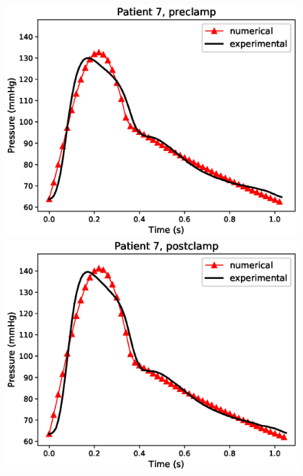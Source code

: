 \documentclass{config}
\begin{document}
\begin{figure}[H]
\begin{minipage}{0.48\textwidth}
\includegraphics[scale=0.5]{Figures/7preclamp.eps}
\end{minipage}
\begin{minipage}{0.48\textwidth}
\includegraphics[scale=0.5]{Figures/7postclamp.eps}
\end{minipage}


\end{figure}
\end{document}
